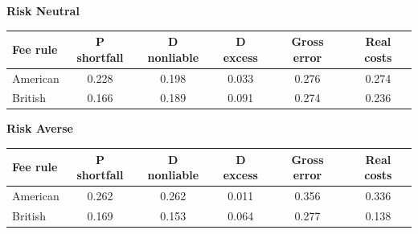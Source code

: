 \documentclass[10pt,border=5pt,varwidth=17cm]{standalone}
\begin{document}
\begingroup
\small
\setlength{\tabcolsep}{5pt}
\renewcommand{\arraystretch}{1.20}
\noindent\textbf{Risk Neutral}\par\smallskip
\noindent\begin{tabularx}{\linewidth}{@{}>{\raggedright\arraybackslash}Xccccc@{}}
\toprule
\textbf{Fee rule} & \textbf{P shortfall} & \textbf{D nonliable} & \textbf{D excess} & \textbf{Gross error} & \textbf{Real costs} \\
\midrule
American & 0.228 & 0.198 & 0.033 & 0.276 & 0.274 \\
British & 0.166 & 0.189 & 0.091 & 0.274 & 0.236 \\
\bottomrule\end{tabularx}\par\medskip
\noindent\textbf{Risk Averse}\par\smallskip
\noindent\begin{tabularx}{\linewidth}{@{}>{\raggedright\arraybackslash}Xccccc@{}}
\toprule
\textbf{Fee rule} & \textbf{P shortfall} & \textbf{D nonliable} & \textbf{D excess} & \textbf{Gross error} & \textbf{Real costs} \\
\midrule
American & 0.262 & 0.262 & 0.011 & 0.356 & 0.336 \\
British & 0.169 & 0.153 & 0.064 & 0.277 & 0.138 \\
\bottomrule\end{tabularx}\par\medskip
\endgroup
\end{document}
